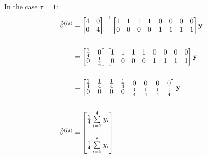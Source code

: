 \documentclass[a4paper]{article}
\begin{document}
\hfill
\vline
\hfill
\begin{minipage}[t]{0.45\linewidth}
In the case $\tau=1$:
\begin{align*}
  \hat{\beta}^{(ls)} 
  &=
    \begin{bmatrix}
      4 & 0\\
      0 & 4\\
    \end{bmatrix}^{-1}
    \begin{bmatrix}
      1 & 1 & 1 & 1 & 0 & 0 & 0 & 0\\
      0 & 0 & 0 & 0 & 1 & 1 & 1 & 1\\
    \end{bmatrix}
    \mathbf{y}\\\\
  &=
    \begin{bmatrix}
      \frac{1}{4} & 0\\
      0 & \frac{1}{4}\\
    \end{bmatrix}
    \begin{bmatrix}
      1 & 1 & 1 & 1 & 0 & 0 & 0 & 0\\
      0 & 0 & 0 & 0 & 1 & 1 & 1 & 1\\
    \end{bmatrix}
    \mathbf{y}\\\\
  &=
    \begin{bmatrix}
      \frac{1}{4} & \frac{1}{4} & \frac{1}{4} & \frac{1}{4} & 0 & 0 & 0 & 0\\
      0 & 0 & 0 & 0 & \frac{1}{4} & \frac{1}{4} & \frac{1}{4} & \frac{1}{4}\\
    \end{bmatrix} \mathbf{y}\\\\
  \hat{\beta}^{(ls)} 
  &=
    \begin{bmatrix}
      \frac{1}{4}\sum\limits_{i=1}^4 y_i\\\\
      \frac{1}{4}\sum\limits_{i=5}^8 y_i\vspace{2pt}\\
    \end{bmatrix}
\end{align*}
\end{minipage}\\
\end{document}
